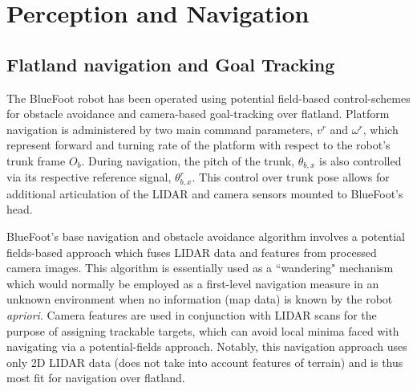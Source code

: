 \chapter{Perception and Navigation}
\label{ch::navigation}


	\section{Flatland navigation and Goal Tracking}
	
		The BlueFoot robot has been operated using potential field-based control-schemes for obstacle avoidance and camera-based goal-tracking over flatland. Platform navigation is administered by two main command parameters, $v^{r}$ and $\omega^{r}$, which represent forward and turning rate of the platform with respect to the robot's trunk frame $O_{b}$. During navigation, the pitch of the trunk, $\theta_{b,x}$ is also controlled via its respective reference signal, $\theta_{b,x}^{r}$. This control over trunk pose allows for additional articulation of the LIDAR and camera sensors mounted to BlueFoot's head. 

		BlueFoot's base navigation and obstacle avoidance algorithm involves a potential fields-based approach which fuses LIDAR data and features from processed camera images. This algorithm is essentially used as a ``wandering" mechanism which would normally be employed as a first-level navigation measure in an unknown environment when no information (\EG map data) is known by the robot \emph{apriori}. Camera features are used in conjunction with LIDAR scans for the purpose of assigning trackable targets, which can avoid local minima faced with navigating via a potential-fields approach. Notably, this navigation approach uses only 2D LIDAR data (does not take into account features of terrain) and is thus most fit for navigation over flatland.

